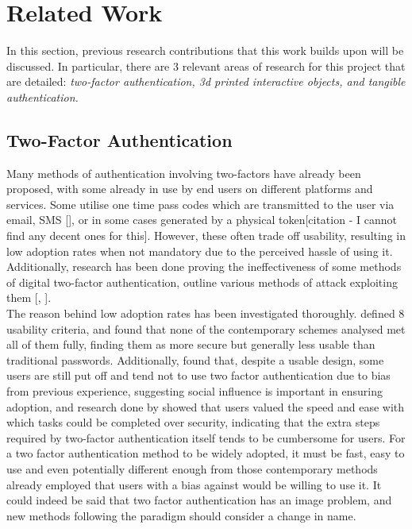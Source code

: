 \documentclass{l4proj}
\begin{document}

\chapter{Related Work}

In this section, previous research contributions that this work builds upon will be discussed. In particular, there are 3 relevant areas of research for this project that are detailed: \textit{two-factor authentication, 3d printed interactive objects, and tangible authentication.}

\section{Two-Factor Authentication}
 
 Many methods of authentication involving two-factors have already been proposed, with some already in use by end users on different platforms and services. Some utilise one time pass codes which are transmitted to the user via email, SMS [\cite{5069395}], or in some cases generated by a physical token[citation - I cannot find any decent ones for this]. However, these often trade off usability, resulting in low adoption rates when not mandatory due to the perceived hassle of using it. Additionally, research has been done proving the ineffectiveness of some methods of digital two-factor authentication, outline various methods of attack exploiting them [\cite{dmitrienko2014security}, \cite{markert2019view}]. \\
 The reason behind low adoption rates has been investigated thoroughly. \cite{bonneau2012quest} defined 8 usability criteria, and found that none of the contemporary schemes analysed met all of them fully, finding them as more secure but generally less usable than traditional passwords. Additionally, \cite{colnago2018s} found that, despite a usable design, some users are still put off and tend not to use two factor authentication due to bias from previous experience, suggesting social influence is important in ensuring adoption, and research done by \cite{dewitt2006aligning} showed that users valued the speed and ease with which tasks could be completed over security, indicating that the extra steps required by two-factor authentication itself tends to be cumbersome for users. For a two factor authentication method to be widely adopted, it must be fast, easy to use and even potentially different enough from those contemporary methods already employed that users with a bias against would be willing to use it. It could indeed be said that two factor authentication has an image problem, and new methods following the paradigm should consider a change in name.
\end{document}

